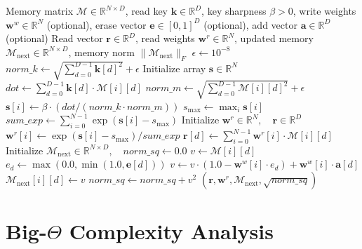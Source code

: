 \documentclass[11pt,a4paper]{article}
\theoremstyle{definition}
\begin{document}
\begin{algorithm}[H]
\caption{Differentiable Neural Memory Content Read and Gated Write}
\begin{algorithmic}[1]
\Require Memory matrix $\mathcal{M} \in \mathbb{R}^{N \times D}$, read key $\mathbf{k} \in \mathbb{R}^D$, key sharpness $\beta > 0$, write weights $\mathbf{w}^w \in \mathbb{R}^N$ (optional), erase vector $\mathbf{e} \in [0, 1]^D$ (optional), add vector $\mathbf{a} \in \mathbb{R}^D$ (optional)
\Ensure Read vector $\mathbf{r} \in \mathbb{R}^D$, read weights $\mathbf{w}^r \in \mathbb{R}^N$, updated memory $\mathcal{M}_{\text{next}} \in \mathbb{R}^{N \times D}$, memory norm $\|\mathcal{M}_{\text{next}}\|_F$
\State $\epsilon \gets 10^{-8}$
\State $norm\_k \gets \sqrt{\sum_{d=0}^{D-1} \mathbf{k}[d]^2} + \epsilon$
\State Initialize array $\mathbf{s} \in \mathbb{R}^N$
 
    \State $dot \gets \sum_{d=0}^{D-1} \mathbf{k}[d] \cdot \mathcal{M}[i][d]$
    \State $norm\_m \gets \sqrt{\sum_{d=0}^{D-1} \mathcal{M}[i][d]^2} + \epsilon$
    \State $\mathbf{s}[i] \gets \beta \cdot (dot / (norm\_k \cdot norm\_m))$
\EndFor
\State $s_{\max} \gets \max_i \mathbf{s}[i]$
\State $sum\_exp \gets \sum_{i=0}^{N-1} \exp(\mathbf{s}[i] - s_{\max})$
\State Initialize $\mathbf{w}^r \in \mathbb{R}^N, \quad \mathbf{r} \in \mathbb{R}^D$
    \State $\mathbf{w}^r[i] \gets \exp(\mathbf{s}[i] - s_{\max}) / sum\_exp$
\EndFor
{} 
    \State $\mathbf{r}[d] \gets \sum_{i=0}^{N-1} \mathbf{w}^r[i] \cdot \mathcal{M}[i][d]$
\EndFor
\State Initialize $\mathcal{M}_{\text{next}} \in \mathbb{R}^{N \times D}, \quad norm\_sq \gets 0.0$
 
        \State $v \gets \mathcal{M}[i][d]$
            \State $e_d \gets \max(0.0, \min(1.0, \mathbf{e}[d]))$
            \State $v \gets v \cdot (1.0 - \mathbf{w}^w[i] \cdot e_d) + \mathbf{w}^w[i] \cdot \mathbf{a}[d]$
        \EndIf
        \State $\mathcal{M}_{\text{next}}[i][d] \gets v$
        \State $norm\_sq \gets norm\_sq + v^2$
    \EndFor
\EndFor
\State \Return $(\mathbf{r}, \mathbf{w}^r, \mathcal{M}_{\text{next}}, \sqrt{norm\_sq})$
\end{algorithmic}
\end{algorithm}

\section{Big-$\Theta$ Complexity Analysis}
\end{document}

